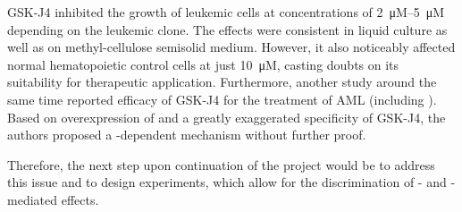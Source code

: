 GSK-J4 inhibited the growth of \mllafnine leukemic cells at concentrations of \SIrange{2}{5}{\micro M} depending on the leukemic clone. The effects were consistent in liquid culture as well as on methyl-cellulose semisolid medium. However, it also noticeably affected normal hematopoietic control cells at just \SI{10}{\micro M}, casting doubts on its suitability for therapeutic application. Furthermore, another study around the same time reported efficacy of GSK-J4 for the treatment of AML (including \mllafnine). Based on overexpression of  and a greatly exaggerated specificity of GSK-J4, the authors proposed a -dependent mechanism without further proof\cite{Li2018}. 

Therefore, the next step upon continuation of the project would be to address this issue and to design experiments, which allow for the discrimination of - and -mediated effects.
